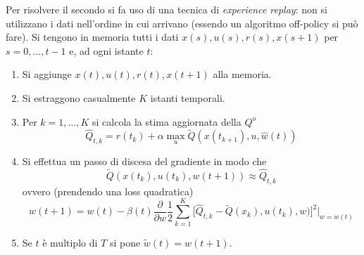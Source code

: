 Per risolvere il secondo si fa uso di una tecnica di \textit{experience replay}: non si utilizzano i dati nell'ordine in cui arrivano (essendo un algoritmo off-policy si pu\`o fare). Si tengono in memoria tutti i dati $x(s),u(s),r(s),x(s+1)$ per $s=0, \dots, t-1$ e, ad ogni istante $t$:
\begin{enumerate}
\item Si aggiunge $x(t),u(t),r(t),x(t+1)$ alla memoria.
\item Si estraggono casualmente $K$ istanti temporali.
\item Per $k=1, \dots, K$ si calcola la stima aggiornata della $Q^o$
    \begin{equation}
    \hat{Q}_{t,k} = r(t_k) + \alpha \max_u \tilde{Q}(x(t_{k+1}),u,\hat{w}(t))
    \end{equation}
\item Si effettua un passo di discesa del gradiente in modo che
    \begin{equation}
    \tilde{Q}(x(t_k), u(t_k), w(t+1)) \approx \hat{Q}_{t,k}
    \end{equation} ovvero (prendendo una loss quadratica)
    \begin{equation}
    w(t+1) = w(t) - \beta(t) \frac{\partial}{\partial w} \frac{1}{2} \sum_{k=1}^K \Big [ \hat{Q}_{t,k} - \tilde{Q}(x_k), u(t_k), w) \Big ]^2 \Big |_{w=w(t)}
    \end{equation}
\item Se $t$ \`e multiplo di $T$ si pone $\tilde{w}(t) = w(t+1)$.
\end{enumerate}
